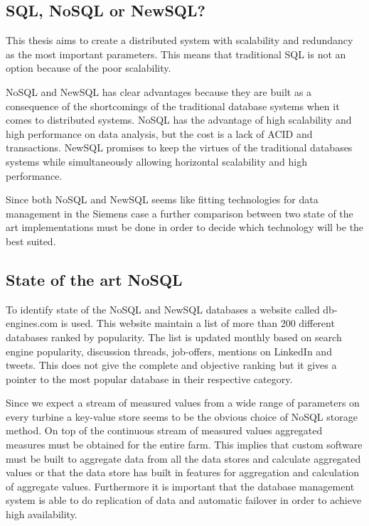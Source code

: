 \subsection{SQL, NoSQL or NewSQL?}
This thesis aims to create a distributed system with scalability and redundancy as the most important parameters.
This means that traditional SQL is not an option because of the poor scalability.

NoSQL and NewSQL has clear advantages because they are built as a consequence of the shortcomings of the traditional database systems when it comes to distributed systems.
NoSQL has the advantage of high scalability and high performance on data analysis, but the cost is a lack of ACID and transactions.
NewSQL promises to keep the virtues of the traditional databases systems while simultaneously allowing horizontal scalability and high performance.

Since both NoSQL and NewSQL seems like fitting technologies for data management in the Siemens case a further comparison between two state of the art implementations must be done in order to decide which technology will be the best suited.

\subsection{State of the art NoSQL}
To identify state of the NoSQL and NewSQL databases a website called db-engines.com\cite{db-engines} is used.
This website maintain a list of more than 200 different databases ranked by popularity. The list is updated monthly based on search engine popularity, discussion threads, job-offers, mentions on LinkedIn and tweets. This does not give the complete and objective ranking but it gives a pointer to the most popular database in their respective category.

Since we expect a stream of measured values from a wide range of parameters on every turbine a key-value store seems to be the obvious choice of NoSQL storage method. On top of the continuous stream of measured values aggregated measures must be obtained for the entire farm. This implies that custom software must be built to aggregate data from all the data stores and calculate aggregated values or that the data store has built in features for aggregation and calculation of aggregate values. Furthermore it is important that the database management system is able to do replication of data and automatic failover in order to achieve high availability.

